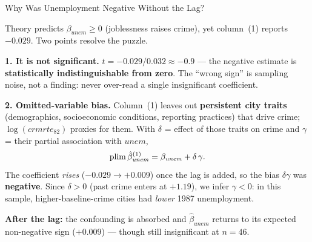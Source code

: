 \documentclass[aspectratio=169, 12pt]{beamer}
\begin{document}
\begin{frame}[shrink=10]{Why Was Unemployment Negative Without the Lag?}

  Theory predicts $\beta_{\mathit{unem}} \ge 0$ (joblessness raises crime), yet column~(1)
  reports $-0.029$. Two points resolve the puzzle.

  \begin{keybox}
    \textbf{1. It is not significant.} $t = -0.029/0.032 \approx -0.9$ --- the negative
    estimate is \textbf{statistically indistinguishable from zero}. The ``wrong sign'' is
    sampling noise, not a finding: never over-read a single insignificant coefficient.
  \end{keybox}

  \begin{highlightbox}
    \textbf{2. Omitted-variable bias.} Column~(1) leaves out \textbf{persistent city
    traits} (demographics, socioeconomic conditions, reporting practices) that drive
    crime; $\log(crmrte_{82})$ proxies for them. With $\delta$ = effect of those traits on
    crime and $\gamma$ = their partial association with $\mathit{unem}$,
    \[
      \operatorname{plim} \hat\beta_{\mathit{unem}}^{(1)} = \beta_{\mathit{unem}} + \delta\,\gamma .
    \]
    The coefficient \emph{rises} ($-0.029 \to +0.009$) once the lag is added, so the bias
    $\delta\gamma$ was \textbf{negative}. Since $\delta>0$ (past crime enters at $+1.19$),
    we infer $\gamma<0$: in this sample, higher-baseline-crime cities had \emph{lower}
    1987 unemployment.
  \end{highlightbox}

  \textbf{After the lag:} the confounding is absorbed and $\hat\beta_{\mathit{unem}}$ returns
  to its expected non-negative sign ($+0.009$) --- though still insignificant at $n=46$.

\end{frame}
\end{document}
